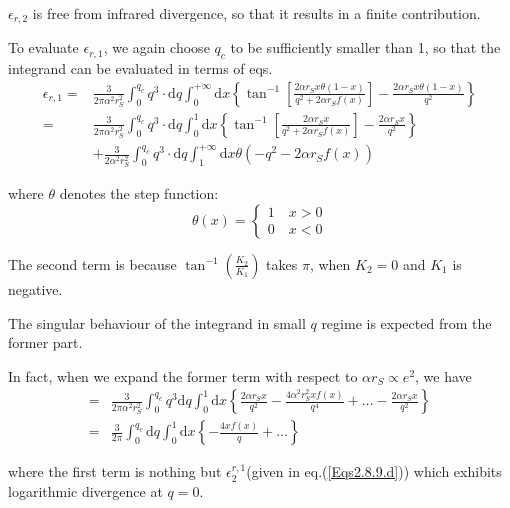 $\epsilon_{r,2}$ is free from infrared divergence, so that it results in a finite contribution.

To evaluate $\epsilon_{r,1}$, we again choose $q_c$ to be sufficiently smaller than 1, so that the integrand can be evaluated in terms of eqs.
\begin{equation} \label{Eqs2.8.41} \begin{split}
\epsilon_{r,1} =& \frac{3}{2\pi \alpha^2 r_S^2}\int_0^{q_c} q^3\cdot \mathrm{d} q \int_0^{+\infty} \mathrm{d} x \left\{ \tan^{-1}\left[ \frac{2\alpha r_S x \theta(1-x)}{q^2+2\alpha r_S f(x)} \right] - \frac{2\alpha r_S x \theta(1-x)}{q^2} \right\}\\
=& \frac{3}{2\pi \alpha^2 r_S^2}\int_0^{q_c} q^3 \cdot \mathrm{d} q \int_0^{1} \mathrm{d} x \left\{ \tan^{-1}\left[ \frac{2\alpha r_S x}{q^2+2\alpha r_S f(x)} \right] - \frac{2\alpha r_S x}{q^2} \right\}\\
&+\frac{3}{2\alpha^2 r_S^2} \int_0^{q_c} q^3 \cdot\mathrm{d}q \int_1^{+\infty} \mathrm{d} x \theta(-q^2-2\alpha r_S f(x))
\end{split}\end{equation}

where $\theta$ denotes the step function:
\[\theta(x) = \left\{ \begin{aligned} 1 \quad x> 0\\
0 \quad x<0 \end{aligned} \right.\]

The second term is because $\tan^{-1}(\frac{K_2}{K_1})$ takes $\pi$, when $K_2=0$ and $K_1$ is negative.

The singular behaviour of the integrand in small $q$ regime is expected from the former part.

In fact, when we expand the former term with respect to $\alpha r_S \propto e^2$, we have
\begin{equation*} \label{Eqs2.8.41'} \tag{2.8.41'}
\begin{split}=& \frac{3}{2\pi \alpha^2 r_S^2} \int_0^{q_c} q^3 \mathrm{d} q \int_0^1 \mathrm{d} x \left\{ \frac{2\alpha r_S x}{q^2} - \frac{4\alpha^2 r_S^2 x f(x)}{q^4} + \ldots - \frac{2\alpha r_S x}{q^2} \right\}\\
=& \frac{3}{2\pi} \int_0^{q_c} \mathrm{d} q \int_0^1 \mathrm{d} x \left\{ -\frac{4 x f(x)}{q} + \ldots \right\}
\end{split}\end{equation*}

where the first term is nothing but $\epsilon_2^{r,1}$(given in eq.(\ref{Eqs2.8.9.d})) which exhibits logarithmic divergence at $q=0$.

